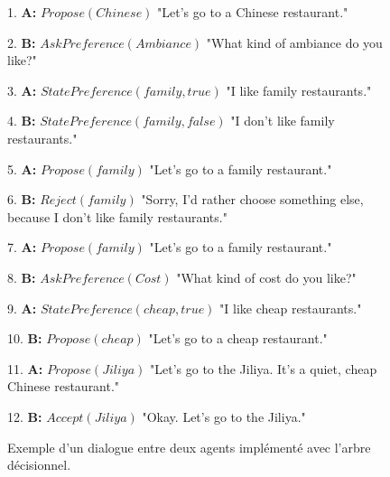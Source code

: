 	\begin{figure} [t]
		\begin{minipage}{.95\textwidth}
		{\ttfamily
			\linenumbers
			\begin{addmargin}[1em]{2em}%
			\vspace{0.5em}			 	
			1.	\textbf{A:} $Propose(Chinese)$ "Let's go to a Chinese \hspace*{3mm} restaurant."
				
			2.	 \hspace*{3mm} \textbf{B:} $AskPreference(Ambiance)$  "What kind of \hspace*{4mm} ambiance do you like?"
				
			3.	\textbf{A:} $StatePreference(family,true)$ "I like family  \hspace*{3mm} restaurants."
				
			4.	\hspace*{3mm} 	\textbf{B:}  $StatePreference(family,false)$ "I don't like \hspace*{4mm} family restaurants."
				
			5.	\textbf{A:}  $Propose(family)$ "Let's go to a family \hspace*{3mm} restaurant."
				
			6.	\hspace*{3mm} 	\textbf{B:} $Reject(family)$ "Sorry, I'd rather choose \hspace*{4mm} something else, because I don't like family \hspace*{4mm} restaurants."
				
			7.	\textbf{A:}  $Propose(family)$ "Let's go to a family \hspace*{3mm} \hspace*{3mm} restaurant."
				
			8.	\hspace*{3mm} 	\textbf{B:} $AskPreference(Cost)$ "What kind of cost do \hspace*{3mm} you like?"
				
			9.	\textbf{A:} $StatePreference(cheap,true)$ "I like cheap \hspace*{3mm} restaurants."
				
			10.	\hspace*{3mm} 	\textbf{B:} $Propose(cheap)$ "Let's go to a cheap \hspace*{4mm} restaurant."
				
			11.	\textbf{A:}  $Propose(Jiliya)$ "Let's go to the Jiliya. It's \hspace*{3mm} a quiet, cheap Chinese restaurant."
				
			12.	\hspace*{3mm} 	\textbf{B:} $Accept(Jiliya)$  "Okay. Let's go to the Jiliya."
			\end{addmargin}
		} 
	\end{minipage}
	\caption{\label{fig:ex-dialogue} Exemple d'un dialogue entre deux agents implémenté avec l'arbre décisionnel.}
\end{figure}
